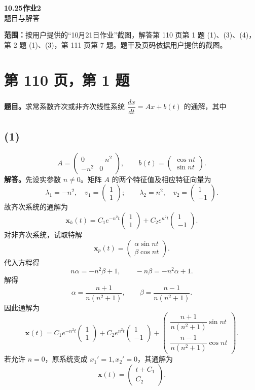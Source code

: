 \documentclass[11pt,a4paper]{ctexart}
\newcommand{\xx}{\boldsymbol{x}}
\begin{document}
\begin{center}{\LARGE\bfseries 10.25作业2}\\[7pt]题目与解答\end{center}
\textbf{范围：}按用户提供的“10月21日作业”截图，解答第 110 页第 1 题 (1)、(3)、(4)，第 2 题 (1)、(3)，第 111 页第 7 题。题干及页码依据用户提供的截图。

\section*{第 110 页，第 1 题}
\textbf{题目。}求常系数齐次或非齐次线性系统 $\dfrac{dx}{dt}=Ax+b(t)$ 的通解，其中

\subsection*{(1)}
\[
A=\begin{pmatrix}0&-n^2\\-n^2&0\end{pmatrix},\qquad
b(t)=\begin{pmatrix}\cos nt\\\sin nt\end{pmatrix}.
\]
\textbf{解答。}先设实参数 $n\ne0$。矩阵 $A$ 的两个特征值及相应特征向量为
\[
\lambda_1=-n^2,\quad v_1=\begin{pmatrix}1\\1\end{pmatrix};\qquad
\lambda_2=n^2,\quad v_2=\begin{pmatrix}1\\-1\end{pmatrix}.
\]
故齐次系统的通解为
\[
\xx_h(t)=C_1e^{-n^2t}\begin{pmatrix}1\\1\end{pmatrix}
+C_2e^{n^2t}\begin{pmatrix}1\\-1\end{pmatrix}.
\]
对非齐次系统，试取特解
\[
\xx_p(t)=\begin{pmatrix}\alpha\sin nt\\\beta\cos nt\end{pmatrix}.
\]
代入方程得
\[
n\alpha=-n^2\beta+1,\qquad -n\beta=-n^2\alpha+1.
\]
解得
\[
\alpha=\frac{n+1}{n(n^2+1)},\qquad
\beta=\frac{n-1}{n(n^2+1)}.
\]
因此通解为
\[
\boxed{\xx(t)=C_1e^{-n^2t}\begin{pmatrix}1\\1\end{pmatrix}
+C_2e^{n^2t}\begin{pmatrix}1\\-1\end{pmatrix}
+\begin{pmatrix}
\dfrac{n+1}{n(n^2+1)}\sin nt\\[5pt]
\dfrac{n-1}{n(n^2+1)}\cos nt
\end{pmatrix}.}
\]
若允许 $n=0$，原系统变成 $x_1'=1,x_2'=0$，其通解为
\[
\boxed{\xx(t)=\begin{pmatrix}t+C_1\\C_2\end{pmatrix}.}
\]
\end{document}
